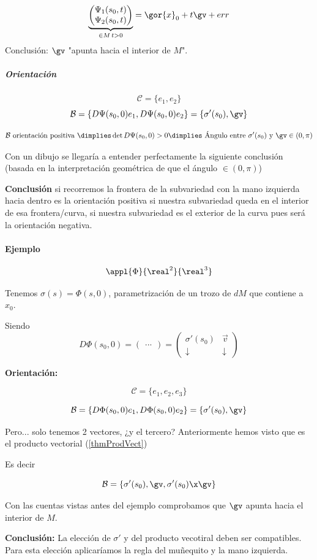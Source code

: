 \[\underbrace{\begin{pmatrix}\Psi_1(s_0,t)\\
\Psi_2(s_0,t)
\end{pmatrix} }_{\in M\, t>0}= \gor{x}_0 + t\gv + err
\]
Conclusión: $\gv$ "apunta hacia el interior de $M$".

\subparagraph{Orientación}
\[\mathcal{C} = \{e_1,e_2\}\]
\[\mathcal{B} = \{D\Psi(s_0,0)e_1,D\Psi(s_0,0)e_2\} = \{\sigma'(s_0),\gv\}\]

\[\mathcal{B} \text{ orientación positiva } \dimplies \det D\Psi(s_0,0) > 0 \dimplies \text{ Ángulo entre } \sigma'(s_0) \text{ y } \gv \in (0,\pi)\]

Con un dibujo se llegaría a entender perfectamente  la siguiente conclusión (basada en la interpretación geométrica de que el ángulo $\in (0,\pi)$)

\textbf{Conclusión} si recorremos la frontera de la subvariedad	 con la mano izquierda hacia dentro es la orientación positiva si nuestra subvariedad queda en el interior de esa frontera/curva, si nuestra subvariedad es el exterior de la curva pues será la orientación negativa.

\paragraph{Ejemplo}

\[\appl{\Phi}{\real^2}{\real^3}\]

Tenemos $\sigma(s) = \Phi(s,0) $, parametrización de un trozo de $dM$ que contiene a $x_0$.

Siendo \[D\Phi(s_0,0) = \begin{pmatrix}
...
\end{pmatrix} = \begin{pmatrix}
\sigma'(s_0) & \overrightarrow{v}\\
\downarrow & \downarrow
\end{pmatrix}\]

\textbf{Orientación:}

\[\mathcal{C}  = \{e_1,e_2,e_3\}\]

\[\mathcal{B} = \{D\Phi(s_0,0)e_1,D\Phi(s_0,0)e_2\} = \{\sigma'(s_0),\gv\}\]

Pero... solo tenemos 2 vectores, ¿y el tercero? Anteriormente hemos visto que es el producto vectorial (\ref{thmProdVect})

Es decir 

\[\mathcal{B} = \{\sigma'(s_0),\gv,\sigma'(s_0)\x\gv\}\]

Con las cuentas vistas antes del ejemplo comprobamos que $\gv$ apunta hacia el interior de $M$.

\textbf{Conclusión:} La elección de $\sigma'$ y del producto vecotiral deben ser compatibles. Para esta elección aplicaríamos la regla del muñequito y la mano izquierda. 


